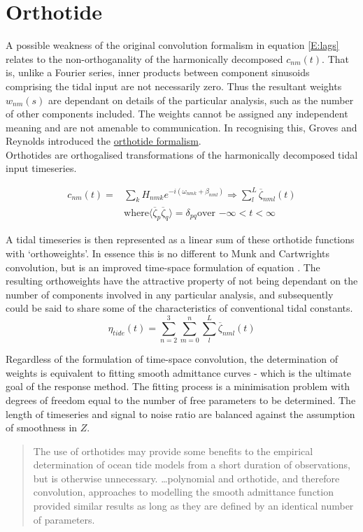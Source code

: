 \section{Orthotide}%
A possible weakness of the original convolution formalism in equation \ref{E:lags} relates to the non-orthoganality of the harmonically decomposed $c_{nm}(t)$.  That is, unlike a Fourier series, inner products between component sinusoids comprising the tidal input are not necessarily zero.   Thus the resultant weights $w_{nm}(s)$ are dependant on details of the particular analysis, such as the number of other components included.  The weights cannot be assigned any independent meaning and are not amenable to communication.  In recognising this, Groves and Reynolds \citep {Groves:1975ky} introduced the \underline{orthotide formalism}.\\
Orthotides are orthogalised transformations of the harmonically decomposed tidal input timeseries.

\begin{align}
c_{nm}(t) =  &\sum_{k} H_{nmk} e^{-i(\omega_{nmk} + \beta_{nml})}  \Rightarrow \sum_{l}^L \overline{\zeta}_{nml}(t)     \nonumber \\
             &\mbox{where} \langle \overline{\zeta}_p \overline{\zeta}_q \rangle  = \delta_{pq}  \mbox{over $-\infty < t < \infty$}             \nonumber
\end{align}

A tidal timeseries is then represented as a linear sum of these orthotide functions with `orthoweights'. In essence this is no different to Munk and Cartwrights convolution, but is an improved time-space formulation of equation \label{E:Z}.  The resulting orthoweights have the attractive property of not being dependant on the number of components involved in any particular analysis, and subsequently could be said to share some of the characteristics of conventional tidal constants.
\begin{equation}
\label{E:orthosum}
\eta_{tide}(t) = \sum_{n=2}^3 \sum_{m=0}^n \sum_{l}^L \overline{\zeta}_{nml}(t)
\end{equation}

Regardless of the formulation of time-space convolution, the determination of weights is equivalent to fitting smooth admittance curves - which is the ultimate goal of the response method.  The fitting process is a minimisation problem with degrees of freedom equal to the number of free parameters to be determined.    The length of timeseries and signal to noise ratio are balanced against the assumption of smoothness in $Z$.
\begin{quotation}   
The use of orthotides may provide some benefits to the empirical determination of ocean tide models from a short duration of observations, but is otherwise unnecessary. \dots  polynomial and orthotide, and therefore convolution, approaches to modelling the smooth admittance function provided similar results as long as they are defined by an identical number of parameters.\citep{Desai:2006wo}
\end{quotation}
